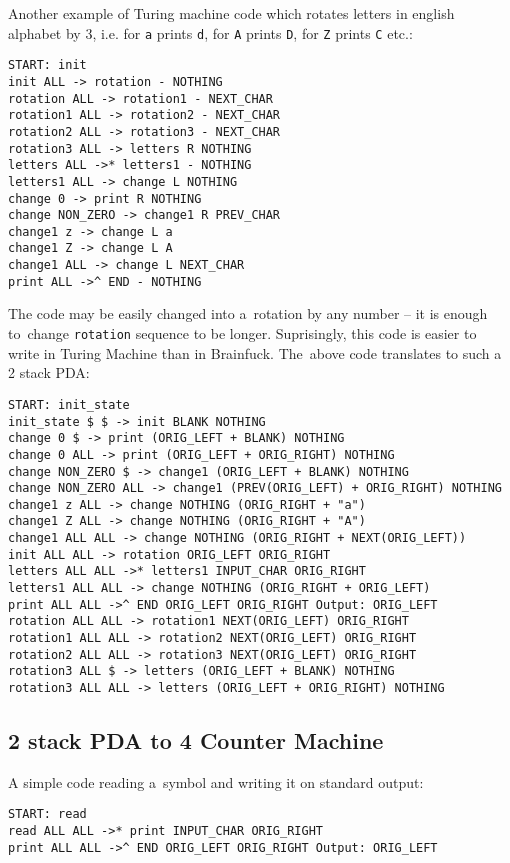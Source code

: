 \documentclass[english,shortabstract,mgr]{iithesis}
\begin{document}
Another example of Turing machine code which rotates letters in english
alphabet by $3$, i.e. for \texttt{a} prints \texttt{d}, for \texttt{A}
prints \texttt{D}, for \texttt{Z} prints \texttt{C} etc.:

\begin{verbatim}
START: init
init ALL -> rotation - NOTHING
rotation ALL -> rotation1 - NEXT_CHAR
rotation1 ALL -> rotation2 - NEXT_CHAR
rotation2 ALL -> rotation3 - NEXT_CHAR
rotation3 ALL -> letters R NOTHING
letters ALL ->* letters1 - NOTHING
letters1 ALL -> change L NOTHING
change 0 -> print R NOTHING
change NON_ZERO -> change1 R PREV_CHAR
change1 z -> change L a
change1 Z -> change L A
change1 ALL -> change L NEXT_CHAR
print ALL ->^ END - NOTHING
\end{verbatim}

The code may be easily changed into a~rotation by any number -- it is enough
to~change \texttt{rotation} sequence to be longer. Suprisingly, this code
is easier to write in Turing Machine than in Brainfuck. The~above code
translates to such a 2 stack PDA:

\begin{verbatim}
START: init_state
init_state $ $ -> init BLANK NOTHING
change 0 $ -> print (ORIG_LEFT + BLANK) NOTHING
change 0 ALL -> print (ORIG_LEFT + ORIG_RIGHT) NOTHING
change NON_ZERO $ -> change1 (ORIG_LEFT + BLANK) NOTHING
change NON_ZERO ALL -> change1 (PREV(ORIG_LEFT) + ORIG_RIGHT) NOTHING
change1 z ALL -> change NOTHING (ORIG_RIGHT + "a")
change1 Z ALL -> change NOTHING (ORIG_RIGHT + "A")
change1 ALL ALL -> change NOTHING (ORIG_RIGHT + NEXT(ORIG_LEFT))
init ALL ALL -> rotation ORIG_LEFT ORIG_RIGHT
letters ALL ALL ->* letters1 INPUT_CHAR ORIG_RIGHT
letters1 ALL ALL -> change NOTHING (ORIG_RIGHT + ORIG_LEFT)
print ALL ALL ->^ END ORIG_LEFT ORIG_RIGHT Output: ORIG_LEFT
rotation ALL ALL -> rotation1 NEXT(ORIG_LEFT) ORIG_RIGHT
rotation1 ALL ALL -> rotation2 NEXT(ORIG_LEFT) ORIG_RIGHT
rotation2 ALL ALL -> rotation3 NEXT(ORIG_LEFT) ORIG_RIGHT
rotation3 ALL $ -> letters (ORIG_LEFT + BLANK) NOTHING
rotation3 ALL ALL -> letters (ORIG_LEFT + ORIG_RIGHT) NOTHING
\end{verbatim}

\subsection{2 stack PDA to 4 Counter Machine}

A simple code reading a~symbol and writing it on standard output:

\begin{verbatim}
START: read
read ALL ALL ->* print INPUT_CHAR ORIG_RIGHT
print ALL ALL ->^ END ORIG_LEFT ORIG_RIGHT Output: ORIG_LEFT
\end{verbatim}
\end{document}
